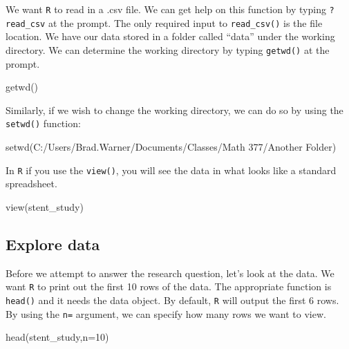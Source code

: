 \documentclass[
]{book}
\newenvironment{Shaded}{\begin{snugshade}}{\end{snugshade}}
\newcommand{\AttributeTok}[1]{\textcolor[rgb]{0.77,0.63,0.00}{#1}}
\newcommand{\DecValTok}[1]{\textcolor[rgb]{0.00,0.00,0.81}{#1}}
\newcommand{\FunctionTok}[1]{\textcolor[rgb]{0.00,0.00,0.00}{#1}}
\newcommand{\NormalTok}[1]{#1}
\newcommand{\StringTok}[1]{\textcolor[rgb]{0.31,0.60,0.02}{#1}}
\begin{document}
We want \texttt{R} to read in a .csv file. We can get help on this function by typing \texttt{?read\_csv} at the prompt. The only required input to \texttt{read\_csv()} is the file location. We have our data stored in a folder called ``data'' under the working directory. We can determine the working directory by typing \texttt{getwd()} at the prompt.

\begin{Shaded}
\begin{Highlighting}[]
\FunctionTok{getwd}\NormalTok{()}
\end{Highlighting}
\end{Shaded}

Similarly, if we wish to change the working directory, we can do so by using the \texttt{setwd()} function:

\begin{Shaded}
\begin{Highlighting}[]
\FunctionTok{setwd}\NormalTok{(}\StringTok{\textquotesingle{}C:/Users/Brad.Warner/Documents/Classes/Math 377/Another Folder\textquotesingle{}}\NormalTok{)}
\end{Highlighting}
\end{Shaded}

In \texttt{R} if you use the \texttt{view()}, you will see the data in what looks like a standard spreadsheet.

\begin{Shaded}
\begin{Highlighting}[]
\FunctionTok{view}\NormalTok{(stent\_study)}
\end{Highlighting}
\end{Shaded}

\hypertarget{explore-data}{%
\subsection{Explore data}\label{explore-data}}

Before we attempt to answer the research question, let's look at the data. We want \texttt{R} to print out the first 10 rows of the data. The appropriate function is \texttt{head()} and it needs the data object. By default, \texttt{R} will output the first 6 rows. By using the \texttt{n=} argument, we can specify how many rows we want to view.

\begin{Shaded}
\begin{Highlighting}[]
\FunctionTok{head}\NormalTok{(stent\_study,}\AttributeTok{n=}\DecValTok{10}\NormalTok{)}
\end{Highlighting}
\end{Shaded}
\end{document}
